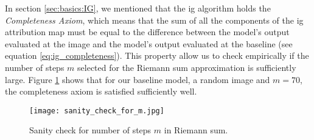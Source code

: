 In section \ref{sec:basics:IG}, we mentioned that the \gls{ig} algorithm holds the \textit{Completeness Axiom}, which means that the sum of all the components of the \gls{ig} attribution map must be equal to the difference between the model's output evaluated at the image and the model's output evaluated at the baseline (see equation \ref{eq:ig_completeness}). This property allow us to check empirically if the number of steps $m$ selected for the Riemann sum approximation is sufficiently large. Figure \ref{fig:VGIG_exp_set:m_sanity} shows that for our baseline model, a random image and $m=70$, the  completeness axiom is satisfied sufficiently well.

\begin{figure}[!ht]
  \centering
  \texttt{[image: sanity\_check\_for\_m.jpg]}
  \caption{Sanity check for number of steps $m$ in Riemann sum.}
  \label{fig:VGIG_exp_set:m_sanity}
\end{figure}
